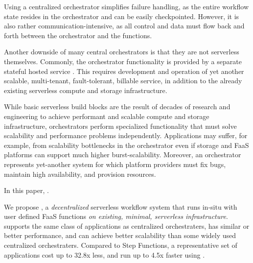 Using a  centralized orchestrator simplifies failure handling, as the entire
workflow state resides in the orchestrator and can be easily checkpointed.
However, it is also rather communication-intensive, as all control and data must
flow back and forth between the orchestrator and the functions.

Another downside of many central orchestrators is that they are not serverless themselves.
Commonly, the orchestrator functionality is provided by a separate stateful hosted service
\cite{aws-step-functions, google-cloud-composer, google-workflows}. This requires
development and operation of yet another scalable, multi-tenant, fault-tolerant, 
billable service, in addition to the already existing serverless compute and storage 
infrastructure. 

While basic
serverless build blocks are the result of decades of research and engineering to
achieve performant and scalable compute and storage infrastructure,
orchestrators perform specialized functionality that must solve
scalability and performance problems independently. Applications may suffer, for
example, from scalability bottlenecks in the orchestrator even if storage and
FaaS platforms can support much higher burst-scalability. Moreover, an
orchestrator represents yet-another system for which platform providers must fix
bugs, maintain high availability, and provision resources.

In this paper, .

We propose \name{}, a \textit{decentralized} serverless workflow system
that runs in-situ with user defined FaaS functions \textit{on existing, minimal,
serverless infrastructure}. \name{} supports the same class of applications as
centralized orchestraters, has similar or better performance, and can achieve
better scalability than some widely used centralized orchestraters. Compared to
Step Functions, a representative set of applications cost up to 32.8x less, and
run up to 4.5x faster using \name{}.


